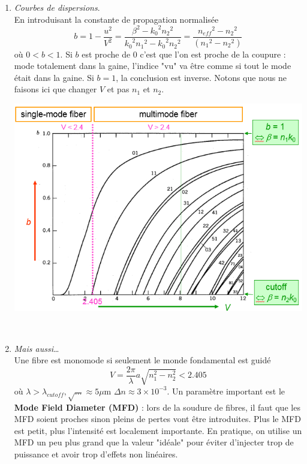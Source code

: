 \begin{enumerate}
\item \textit{Courbes de dispersions}.\\
En introduisant la constante de propagation normalisée
\begin{equation}
b = 1 - \frac{{{u^2}}}{{{V^2}}} = \frac{{{\beta ^2} - {k_0}^2{n_2}^2}}{{{k_0}^2{n_1}^2 -
 {k_0}^2{n_2}^2}} = \frac{{{n_{eff}}^2 - {n_2}^2}}{{({n_1}^2 - {n_2}^2)}}
\end{equation}
où $0<b<1$. Si $b$ est proche de 0 c'est que l'on est proche de la coupure : mode totalement dans la
gaine, l'indice "vu" va être comme si tout le mode était dans la gaine. Si $b=1$, la conclusion est 
inverse. Notons que nous ne faisons ici que changer $V$ et pas $n_1$ et $n_2$.
\begin{center}
	\includegraphics[scale=0.4]{ch1/image28}
\end{center}\ \\

\item \textit{Mais aussi}\dots\\
Une fibre est monomode si seulement le monde fondamental est guidé
\begin{equation}
V = \frac{{2\pi }}{\lambda }a\sqrt {n_1^2 - n_2^2}  < 2.405
\end{equation}
où $\lambda > \lambda_{cutoff}, \sqrt{\dots} \approx 5\mu$m $\Delta n \approx 3\times 10^{-3}$. Un
paramètre important est le \textbf{Mode Field Diameter (MFD)} : lors de la soudure de fibres, il 
faut que les MFD soient proches sinon pleins de pertes vont être introduites. Plus le MFD est 
petit, plus l'intensité est localement importante. En pratique, on utilise un MFD un peu plus grand
que la valeur "idéale" pour éviter d'injecter trop de puissance et avoir trop d'effets non linéaires.
\end{enumerate}

